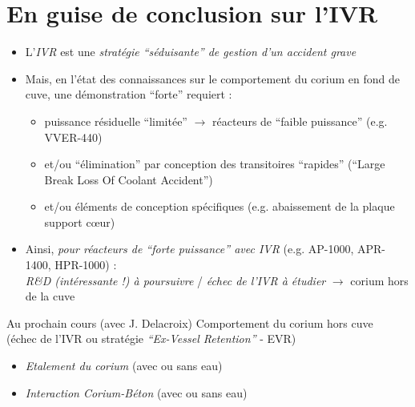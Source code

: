 \documentclass[usenames,dvipsnames]{beamer}
\renewcommand{\emph}[1]{\textcolor{cea8}{\textit{#1}}}
\begin{document}


\section*{En guise de conclusion sur l'IVR}
\begin{frame}[fragile]
\begin{itemize}
\item L'\emph{IVR} est une \emph{stratégie ``séduisante'' de gestion d'un accident grave}
\item Mais, en l'état des connaissances sur le comportement du corium en fond de cuve, une démonstration ``forte'' requiert :
\begin{itemize}
\item puissance résiduelle ``limitée'' $\rightarrow$ réacteurs de ``faible puissance'' (e.g. VVER-440) 
\item et/ou ``élimination'' par conception des transitoires ``rapides'' (``Large Break Loss Of Coolant Accident'')
\item et/ou éléments de conception spécifiques (e.g. abaissement de la plaque support c\oe ur)
\end{itemize}
\item Ainsi, \emph{pour réacteurs de ``forte puissance'' avec IVR} (e.g. AP-1000, APR-1400, HPR-1000) : \\ \emph{R\&D (intéressante !) à poursuivre} / 
\emph{échec de l'IVR à étudier} $\rightarrow$ corium hors de la cuve
\end{itemize}
\begin{ceaexample2block}{Au prochain cours (avec J. Delacroix)}
Comportement du corium hors cuve \\ (échec de l'IVR ou stratégie \emph{``Ex-Vessel Retention''} - EVR)
\begin{itemize}
  \item \emph{Etalement du corium} (avec ou sans eau)
  \item \emph{Interaction Corium-Béton} (avec ou sans eau)
\end{itemize}
\end{ceaexample2block}
\end{frame}
\end{document}
